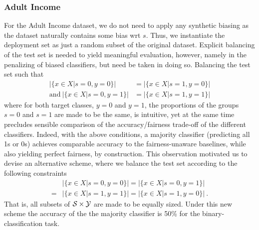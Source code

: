 \subsubsection{Adult Income}\label{ssec:dataset-construction-adult}
For the Adult Income dataset, we do not need to apply any synthetic biasing as the dataset naturally contains some bias wrt $s$. Thus, we instantiate the deployment set as just a random subset of the original dataset. Explicit balancing of the test set is needed to yield meaningful evaluation, however, namely in the penalizing of biased classifiers, but need be taken in doing so. Balancing the test set such that
\begin{align}
    |\{x \in X |s=0, y=0\}| &= |\{x \in X |s=1, y=0\}|    \nonumber\\
    \text{and}~|\{x \in X |s=0, y=1\}| &= |\{x \in X |s=1, y=1\}|
\end{align}
where for both target classes, $y=0$ and $y=1$, the proportions of the groups $s=0$ and $s=1$ are made to be the same, is intuitive, yet at the same time precludes sensible comparison of the accuracy/fairness trade-off of the different classifiers.
Indeed, with the above conditions, a majority classifier (predicting all 1s or 0s) achieves comparable accuracy to the fairness-unaware baselines, while also yielding perfect fairness, by construction.
This observation motivated us to devise an alternative scheme, where we balance the test set according to the following constraints
\begin{align}
    & |\{x \in X |s=0, y=0\}| 
    = |\{x \in X |s=0, y=1\}|  \nonumber \\
    = &|\{x \in X |s=1, y=1\}|
    = |\{x \in X |s=1, y=0\}|~.
 \end{align}
That is, all subsets of ${\mathcal{S}} \times {\mathcal{Y}}$ are made to be equally sized. Under this new scheme the accuracy of the the majority classifier is 50\% for the binary-classification task.


